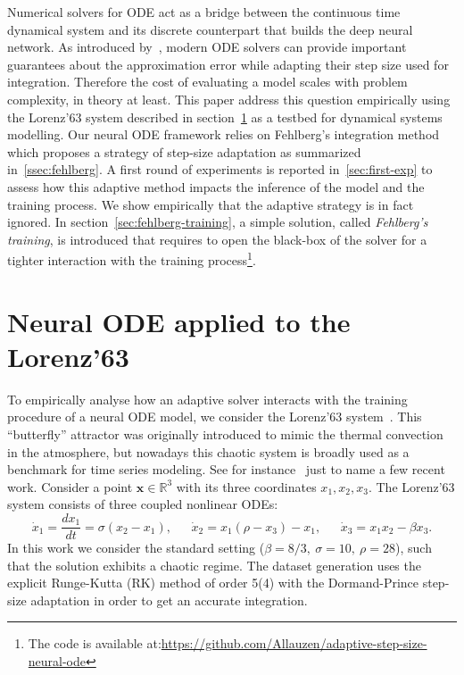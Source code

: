 \documentclass{article}
\newcommand{\R}{\ensuremath{\mathbb{R}}}
\newcommand{\x}{\ensuremath{\mathbf{x}}} %
\begin{document}
Numerical solvers for ODE act as a bridge between the continuous time
dynamical system and its discrete counterpart that builds the deep
neural network. As introduced by~\cite{Chen18NODE}, modern ODE solvers
can provide important guarantees about the approximation error while
adapting their step size used for integration. Therefore the cost of
evaluating a model scales with problem complexity, in theory at
least. This paper address this question empirically using the
Lorenz'63 system described in section~\ref{sec:node} as a testbed for
dynamical systems modelling. Our neural ODE framework relies on
Fehlberg's integration method which proposes a strategy of step-size
adaptation as summarized in~\ref {ssec:fehlberg}. A first round of
experiments is reported in~\ref{sec:first-exp} to assess how this
adaptive method impacts the inference of the model and the training
process. We show empirically that the adaptive strategy is in fact
ignored.  In section~\ref{sec:fehlberg-training}, a simple solution,
called \textit{Fehlberg's training}, is introduced that requires to
open the black-box of the solver for a tighter interaction with the
training process\footnote{The code is available at:\url{https://github.com/Allauzen/adaptive-step-size-neural-ode}}.
 
\section{Neural ODE applied to the Lorenz'63}
\label{sec:node}

To empirically analyse how an adaptive solver interacts with the
training procedure of a neural ODE model, we consider the
Lorenz'63 system~\cite{Lorenz63}. This ``butterfly'' attractor was
originally introduced to mimic the thermal convection in the
atmosphere, but nowadays this chaotic system is broadly used
as a benchmark for time series modeling. See for
instance~\cite{Nassar18Tree,Champion19Data,Greydanus19Hamlitonian,Dubois20Data,Gilpin21Chaos}
just to name a few recent work. Consider a point $\x \in \R^3$ with its three
coordinates $x_1, x_2, x_3$. The Lorenz'63 system consists of three
coupled nonlinear ODEs:
\begin{equation}
  \label{eq:lorenz}
  \dot{x}_1 = \frac{dx_1}{dt} = \sigma (x_2 - x_1),\phantom{5ex}
  \dot{x}_2 = x_1(\rho - x_3) - x_1,\phantom{5ex}
  \dot{x}_3 = x_1x_2 - \beta x_3.
\end{equation}
In this work we consider the standard setting
($\beta = 8/3,\ \sigma = 10,\ \rho = 28$), such that the solution
exhibits a chaotic regime. The dataset generation uses the explicit
Runge-Kutta (RK) method of order 5(4) with the Dormand-Prince
step-size adaptation in order to get an accurate integration.
\end{document}
